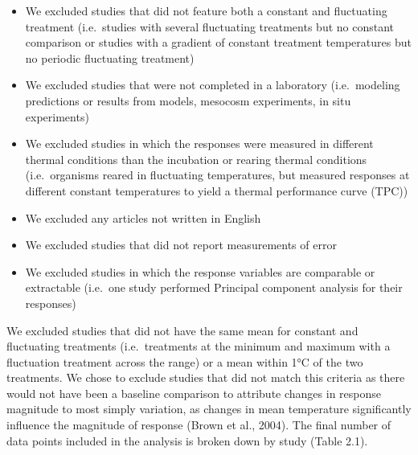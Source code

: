 \documentclass[12pt,twoside]{reedthesis}
\providecommand{\tightlist}{%
  \setlength{\itemsep}{0pt}\setlength{\parskip}{0pt}}
\begin{document}
\begin{itemize}
\tightlist
\item
  We excluded studies that did not feature both a constant and fluctuating treatment (i.e.~studies with several fluctuating treatments but no constant comparison or studies with a gradient of constant treatment temperatures but no periodic fluctuating treatment)
\item
  We excluded studies that were not completed in a laboratory (i.e.~modeling predictions or results from models, mesocosm experiments, in situ experiments)
\item
  We excluded studies in which the responses were measured in different thermal conditions than the incubation or rearing thermal conditions (i.e.~organisms reared in fluctuating temperatures, but measured responses at different constant temperatures to yield a thermal performance curve (TPC))
\item
  We excluded any articles not written in English
\item
  We excluded studies that did not report measurements of error
\item
  We excluded studies in which the response variables are comparable or extractable (i.e.~one study performed Principal component analysis for their responses)
\end{itemize}
We excluded studies that did not have the same mean for constant and fluctuating treatments (i.e.~treatments at the minimum and maximum with a fluctuation treatment across the range) or a mean within 1°C of the two treatments. We chose to exclude studies that did not match this criteria as there would not have been a baseline comparison to attribute changes in response magnitude to most simply variation, as changes in mean temperature significantly influence the magnitude of response (Brown et al., 2004). The final number of data points included in the analysis is broken down by study (Table 2.1).
\end{document}
